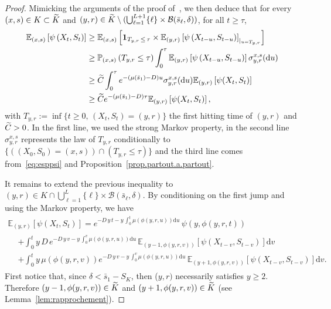 \documentclass[10pt]{amsart}
\theoremstyle{definition}\newtheorem{defi}[theo]{Definition}\newtheorem{rema}[theo]{Remark}\newtheorem{exam}[theo]{Example}\newtheorem{exem}[theo]{Example}\newtheorem{nota}[theo]{Notation}
\newcommand{\PP}{\mathbb{P}}
\newcommand{\EE}{\mathbb{E}}
\newcommand{\clB}{\mathcal{B}}
\newcommand{\dif}{\mathrm{d}}
\newcommand{\SmaxK}{S_K}
\newcommand{\barmu}{\mu(\bar s_1)}
\newcommand{\1}{\mathbf{1}}
\let\oldtilde\tilde
\renewcommand*{\tilde}[1]{\mathchoice{\widetilde{#1}}{\widetilde{#1}}{\oldtilde{#1}}{\oldtilde{#1}}}
\begin{document}
\begin{proof}
Mimicking the arguments of the proof of~\cite[Theorem~1.1]{CG20}, we then deduce that for every $(x,s) \in K \subset \tilde K$ and $(y,r)\in \tilde K \setminus (\bigcup_{\ell= 1}^{L+1} \{\ell\} \times \clB(\bar s_\ell, \delta))$, for all $t\geq \tau$,
\begin{equation}\label{eq:presqueA4}
\begin{split}
\EE_{(x,s)} \left[\psi \left(X_t, S_t\right)\right] &\geq \EE_{(x,s)} \left[\1_{T_{y,r} \,\leq\,\tau} \times \EE_{(y,r)}\left[\psi\left(X_{t- u}, S_{t- u}\right)\right]_{\vert_{u=T_{y,r}}}\right]\\
&\geq \PP_{(x,s)}\left(T_{y,r} \leq \tau \right) \int_0^\tau \EE_{(y,r)}\left[\psi\left(X_{t- u}, S_{t-u}\right)\right] \sigma^{x,s}_{y,r}(\dif u)\\
&\geq \tilde C\int_0^\tau e^{-(\barmu-D) u} \sigma^{x,s}_{y,r}(\dif u) \EE_{(y,r)} \left[\psi (X_t, S_t)\right]\\
&\geq \tilde C e^{-(\barmu-D) \tau} \EE_{(y,r)} \left[\psi (X_t, S_t)\right], 
\end{split}
\end{equation}
with $T_{y,r}:=\inf\{t\geq 0, \, (X_t,S_t)=(y,r)\}$ the first hitting time of $(y,r)$ and $\tilde C>0$. In the first line, we used the strong Markov property, in the second line $\sigma^{x,s}_{y,r}$ represents the law of $T_{y,r}$ conditionally to $\{((X_0,S_0)=(x,s)) \cap (T_{y,r}\leq \tau)\}$ and the third line comes from~\eqref{eq:esppsi} and Proposition~\ref{prop.partout.a.partout}.


It remains to extend the previous inequality to $(y,r) \in K \cap \bigcup_{\ell= 1}^L \{\ell\} \times \clB(\bar s_\ell, \delta)$. By conditioning on the first jump and using the Markov property, we have
\begin{multline}\label{eq:duhamel}
\EE_{(y,r)} \left[\psi (X_t, S_t)\right]= e^{-D\,y \,t - y\,\int_0^t \mu (\phi(y,r,u)) \dif u} \,\psi\left(y, \phi(y,r,t)\right)\\
\begin{aligned}
&+ \int_0^t y\,D \,e^{-D \,y \,v - y\,\int_0^v \mu (\phi(y,r,u)) \dif u}\, \EE_{(y-1, \phi(y,r,v))} \left[\psi (X_{t-v}, S_{t-v})\right] \dif v\\
&+ \int_0^t y\,\mu (\phi(y,r,v)) e^{-D\, y\, v - y\, \int_0^v \mu (\phi(y,r,u)) \dif u} \, \EE_{(y+1, \phi(y,r,v))} \left[\psi (X_{t-v}, S_{t-v})\right] \dif v.
\end{aligned}
\end{multline}
First notice that, since $\delta<\bar s_1- \SmaxK$, then ($y,r)$ necessarily satisfies $y\geq 2$. Therefore $(y-1, \phi(y,r,v))\in \tilde K$ and $(y+1, \phi(y,r,v))\in \tilde K$ (see Lemma~\ref{lem:rapprochement}).


\end{proof}
\end{document}
